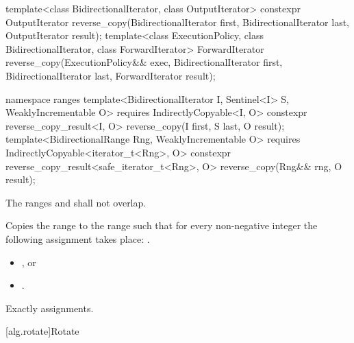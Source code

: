 %
\begin{itemdecl}
template<class BidirectionalIterator, class OutputIterator>
  constexpr OutputIterator
    reverse_copy(BidirectionalIterator first, BidirectionalIterator last,
                 OutputIterator result);
template<class ExecutionPolicy, class BidirectionalIterator, class ForwardIterator>
  ForwardIterator
    reverse_copy(ExecutionPolicy&& exec,
                 BidirectionalIterator first, BidirectionalIterator last,
                 ForwardIterator result);
\end{itemdecl}
\begin{addedblock}
\begin{itemdecl}
namespace ranges {
  template<BidirectionalIterator I, Sentinel<I> S, WeaklyIncrementable O>
    requires IndirectlyCopyable<I, O>
    constexpr reverse_copy_result<I, O>
      reverse_copy(I first, S last, O result);
  template<BidirectionalRange Rng, WeaklyIncrementable O>
    requires IndirectlyCopyable<iterator_t<Rng>, O>
    constexpr reverse_copy_result<safe_iterator_t<Rng>, O>
      reverse_copy(Rng&& rng, O result);
}
\end{itemdecl}
\end{addedblock}

\begin{itemdescr}
\pnum
\requires
The ranges
and
shall not overlap.

\pnum
\effects
Copies the range
to the range
such that
for every non-negative integer
the following assignment takes place:
.

\pnum
\returns
\begin{itemize}
\item {}, or

\item {}.
\end{itemize}

\pnum
\complexity
Exactly
assignments.
\end{itemdescr}


[alg.rotate]{Rotate}


